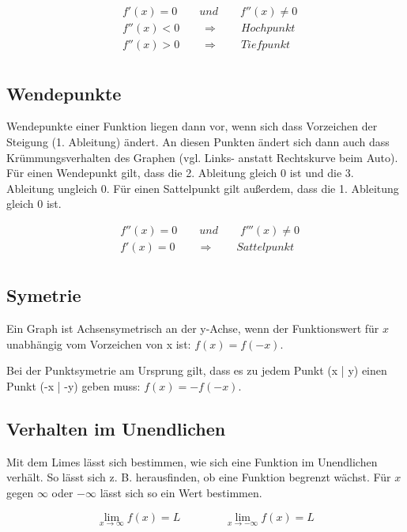 \begin{align*}
    & f'(x) = 0 \qquad und \qquad f''(x) \neq 0 \\
    & f''(x) < 0 \qquad \Rightarrow \qquad Hochpunkt \\
    & f''(x) > 0 \qquad \Rightarrow \qquad Tiefpunkt \\
\end{align*}

\subsection{Wendepunkte}

Wendepunkte einer Funktion liegen dann vor, wenn sich dass Vorzeichen der Steigung (1. Ableitung)
ändert. An diesen Punkten ändert sich dann auch dass Krümmungsverhalten des Graphen
(vgl. Links- anstatt Rechtskurve beim Auto).
Für einen Wendepunkt gilt, dass die 2. Ableitung gleich 0 ist und die 3. Ableitung ungleich 0.
Für einen Sattelpunkt gilt außerdem, dass die 1. Ableitung gleich 0 ist.

\begin{align*}
    & f''(x) = 0 \qquad und \qquad f'''(x) \neq 0 \\
    & f'(x) = 0 \qquad \Rightarrow \qquad Sattelpunkt \\
\end{align*}

\subsection{Symetrie}

Ein Graph ist Achsensymetrisch an der y-Achse, wenn der Funktionswert für $x$ unabhängig vom
Vorzeichen von x ist: $f(x) = f(-x)$.

Bei der Punktsymetrie am Ursprung gilt, dass es zu jedem Punkt (x | y) einen Punkt (-x | -y)
geben muss: $f(x) = -f(-x)$.

\subsection{Verhalten im Unendlichen}

Mit dem Limes lässt sich bestimmen, wie sich eine Funktion im Unendlichen verhält.
So lässt sich z. B. herausfinden, ob eine Funktion begrenzt wächst.
Für $x$ gegen $\infty$ oder $-\infty$ lässt sich so ein Wert bestimmen.

\begin{equation*}
    \lim_{x \to \infty} f(x) = L \qquad \qquad \lim_{x \to -\infty} f(x) = L
\end{equation*}

